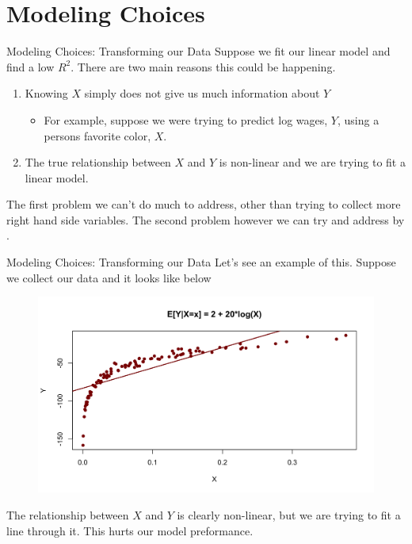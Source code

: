 \documentclass[notheorems, 9pt, handout]{beamer}
\begin{document}
\section{Modeling Choices}%
\begin{frame}{Modeling Choices: Transforming our Data} 
	\label{frame:m1}
	Suppose we fit our linear model and find a low \(R^2\). There are two main reasons this could be happening.
	\begin{enumerate}
		\item<1-> Knowing \(X\) simply does not give us much information about  \(Y\)
		 \begin{itemize}
			\item<2-> For example, suppose we were trying to predict log wages, \(Y\), using a persons favorite color,  \(X\).
		\end{itemize}
		\item<3-> The true relationship between \(X\) and  \(Y\) is non-linear and we are trying to fit a linear model.
	\end{enumerate}
	The first problem we can't do much to address, other than trying to collect more right hand side variables. The second problem however we can try and address by .
\end{frame}
\begin{frame}{Modeling Choices: Transforming our Data} 
	\label{frame:m2}
	Let's see an example of this. Suppose we collect our data and it looks like below
	\begin{figure}[htpb]
		\centering
		\includegraphics[width=0.8\linewidth]{nonlinear1.png}
	\end{figure}
	The relationship between \(X\) and  \(Y\) is clearly non-linear, but we are trying to fit a line through it. This hurts our model preformance.
\end{frame}
\end{document}

